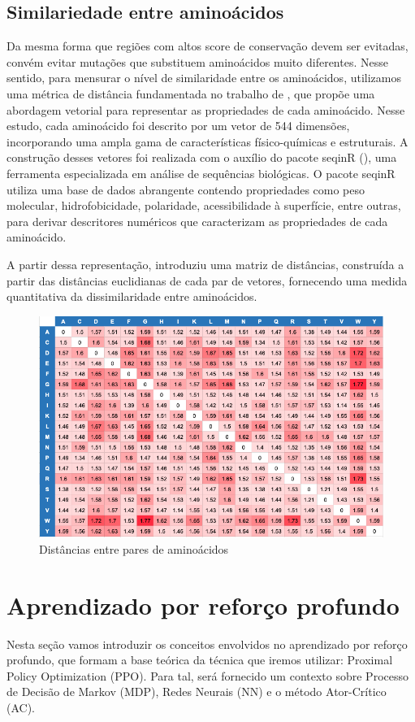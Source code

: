\subsection{Similariedade entre aminoácidos}
\label{subsection:AminoDist}
Da mesma forma que regiões com altos score de conservação devem ser evitadas, 
convém evitar mutações que substituem aminoácidos muito diferentes.
Nesse sentido, para mensurar o nível de similaridade entre os aminoácidos,
utilizamos uma métrica de distância fundamentada no trabalho de \cite{aminodist}, 
que propõe uma abordagem vetorial para representar as propriedades de cada aminoácido.
Nesse estudo, cada aminoácido foi descrito por um vetor de 544 dimensões, 
incorporando uma ampla gama de características físico-químicas e estruturais. 
A construção desses vetores foi realizada com o auxílio do pacote seqinR (\cite{seqinR}), 
uma ferramenta especializada em análise de sequências biológicas.
O pacote seqinR utiliza uma base de dados abrangente contendo propriedades como peso molecular,
hidrofobicidade, polaridade, acessibilidade à superfície, entre outras,
para derivar descritores numéricos que caracterizam as propriedades de cada aminoácido.

A partir dessa representação, \cite{aminodist} introduziu
uma matriz de distâncias, construída a partir das distâncias euclidianas de cada par 
de vetores, fornecendo uma medida quantitativa da dissimilaridade entre aminoácidos.


\begin{figure}[H]
    \centering
    \includegraphics[width=.8\textwidth]{figuras/matrix_amino_dist.png}
    \caption[Distâncias entre aminoácidos]{Distâncias entre pares de aminoácidos \cite{aminodist}}
    \label{fig:matrixaminodist}
  \end{figure}


\section{Aprendizado por reforço profundo}
Nesta seção vamos introduzir os conceitos envolvidos no aprendizado por reforço profundo, que formam a base teórica da técnica que iremos utilizar: Proximal Policy Optimization (PPO). 
Para tal, será fornecido um contexto sobre Processo de Decisão de Markov (MDP), Redes Neurais (NN) e o método Ator-Crítico (AC). 


